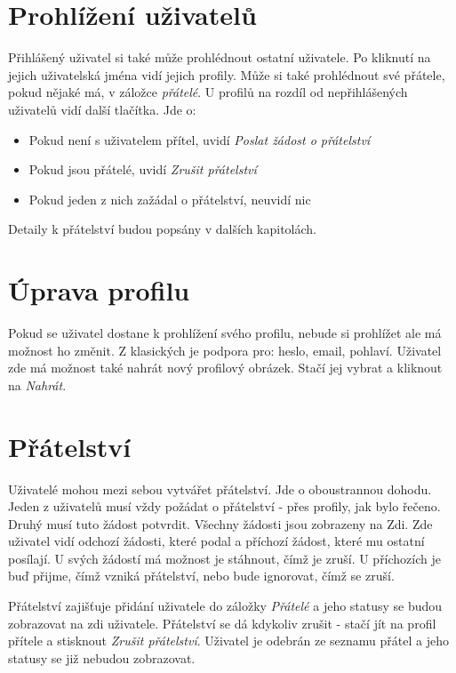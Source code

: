 \documentclass[
12pt,
a4paper,
pdftex,
czech,
titlepage
]{report}
\begin{document}
\section{Prohlížení uživatelů}

Přihlášený uživatel si také může prohlédnout ostatní uživatele. Po kliknutí na jejich uživatelská jména vidí jejich profily. Může si také prohlédnout své přátele, pokud nějaké má, v záložce \textit{přátelé}. U profilů na rozdíl od nepřihlášených uživatelů vidí další tlačítka. Jde o:
\begin{itemize}
\item Pokud není s uživatelem přítel, uvidí \textit{Poslat žádost o přátelství}
\item Pokud jsou přátelé, uvidí \textit{Zrušit přátelství}
\item Pokud jeden z nich zažádal o přátelství, neuvidí nic
\end{itemize}

Detaily k přátelství budou popsány v dalších kapitolách.

\section{Úprava profilu}

Pokud se uživatel dostane k prohlížení svého profilu, nebude si prohlížet ale má možnost ho změnit. Z klasických je podpora pro: heslo, email, pohlaví. Uživatel zde má možnost také nahrát nový profilový obrázek. Stačí jej vybrat a kliknout na \textit{Nahrát}. 

\section{Přátelství}

Uživatelé mohou mezi sebou vytvářet přátelství. Jde o oboustrannou dohodu. Jeden z uživatelů musí vždy požádat o přátelství - přes profily, jak bylo řečeno. Druhý musí tuto žádost potvrdit. Všechny žádosti jsou zobrazeny na Zdi. Zde uživatel vidí odchozí žádosti, které podal a příchozí žádost, které mu ostatní posílají. U svých žádostí má možnost je stáhnout, čímž je zruší. U příchozích je buď přijme, čímž vzniká přátelství, nebo bude ignorovat, čímž se zruší.

Přátelství zajišťuje přidání uživatele do záložky \textit{Přátelé} a jeho statusy se budou zobrazovat na zdi uživatele. Přátelství se dá kdykoliv zrušit - stačí jít na profil přítele a stisknout \textit{Zrušit přátelství}. Uživatel je odebrán ze seznamu přátel a jeho statusy se již nebudou zobrazovat.
\end{document}
